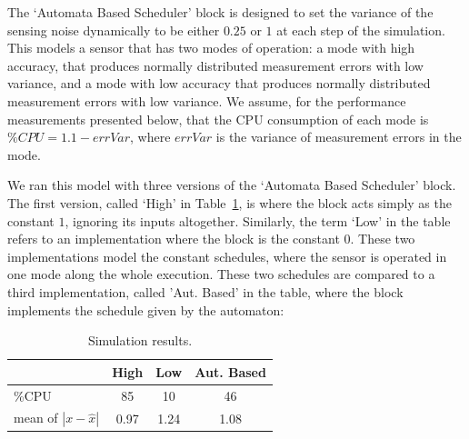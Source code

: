 \documentclass{sig-alternate-ipsn13}
\begin{document}
The `Automata Based Scheduler' block is designed to set the variance of the sensing noise dynamically to be either $0.25$ or $1$ at each step of the simulation. This models a sensor that has two modes of operation: a mode with high accuracy, that produces normally distributed measurement errors with low variance, and a mode with low accuracy that produces normally distributed measurement errors with low variance. We assume, for the performance measurements presented below, that the CPU consumption of each mode is $\%CPU=1.1-errVar$, where $errVar$ is the variance of measurement errors in the mode.

We ran this model with three versions of the `Automata Based Scheduler' block. The first version, called `High' in Table~\ref{tbl:sim-results}, is where the block acts simply as the constant $1$, ignoring its inputs altogether. Similarly, the term `Low' in the table refers to an implementation where the block is the constant $0$. These two implementations model the constant schedules, where the sensor is operated in one mode along the whole execution. These two schedules are compared to a third implementation, called 'Aut. Based' in the table, where the block implements the schedule given by the automaton:
\begin{center}
\end{center}

%
%

\begin{table}
	\centering
	\begin{tabular}{ |  l  | c | c | c | }
		\hline
		&  High & Low & Aut. Based \\ \hline \hline
		\%CPU                    & 85 & 10  & 46 \\ \hline
		mean of $|x -\hat{x}|$ & 0.97 & 1.24 & 1.08 \\ \hline
	\end{tabular}
	\caption{Simulation results.}
	\label{tbl:sim-results}
\end{table}
\end{document}

